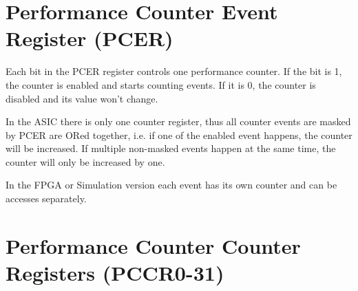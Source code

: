 \section{Performance Counter Event Register (PCER)}


Each bit in the PCER register controls one performance counter. If the bit is
1, the counter is enabled and starts counting events. If it is 0, the counter
is disabled and its value won't change.

In the ASIC there is only one counter register, thus all counter events are
masked by PCER are ORed together, i.e. if one of the enabled event happens,
the counter will be increased. If multiple non-masked events happen at the same
time, the counter will only be increased by one.

In the FPGA or Simulation version each event has its own counter and can be
accesses separately.


\section{Performance Counter Counter Registers (PCCR0-31)}

